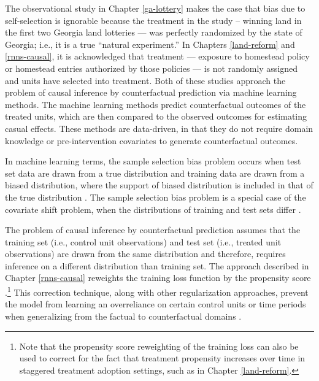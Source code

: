 The observational study in Chapter \ref{ga-lottery} makes the case that bias due to self-selection is ignorable because the treatment in the study -- winning land in the first two Georgia land lotteries --- was perfectly randomized by the state of Georgia; i.e., it is a true ``natural experiment.'' In Chapters \ref{land-reform} and \ref{rnns-causal}, it is acknowledged that treatment --- exposure to homestead policy or homestead entries authorized by those policies --- is not randomly assigned and units have selected into treatment. Both of these studies approach the problem of causal inference by counterfactual prediction via machine learning methods. The machine learning methods predict counterfactual outcomes of the treated units, which are then compared to the observed outcomes for estimating casual effects. These methods are data-driven, in that they do not require domain knowledge or pre-intervention covariates to generate counterfactual outcomes.  

In machine learning terms, the sample selection bias problem occurs when test set data are drawn from a true distribution and training data are drawn from a biased distribution, where the support of biased distribution is included in that of the true distribution \citep{cortes2008sample}. The sample selection bias problem is a special case of the covariate shift problem, when the distributions of training and test sets differ \citep{bickel2007discriminative}. 

The problem of causal inference by counterfactual prediction assumes that the training set (i.e., control unit observations) and test set (i.e., treated unit observations) are drawn from the same distribution and therefore, requires inference on a different distribution than training set. The approach described in Chapter \ref{rnns-causal} reweights the training loss function by the propensity score \citep{rosenbaum1983central}.\footnote{Note that the propensity score reweighting of the training loss can also be used to correct for the fact that treatment propensity increases over time in staggered treatment adoption settings, such as in Chapter \ref{land-reform}.} This correction technique, along with other regularization approaches, prevent the model from learning an overreliance on certain control units or time periods when generalizing from the factual to counterfactual domains \citep{johansson2016learning}.
	